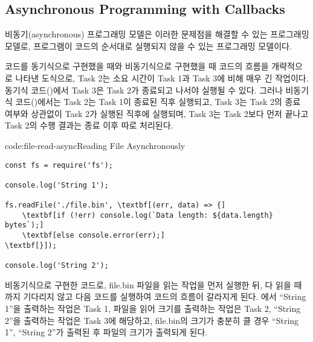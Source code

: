 \subsection*{Asynchronous Programming with Callbacks}

비동기(asynchronous) 프로그래밍 모델은 이러한 문제점을 해결할 수 있는 프로그래밍 모델로, 프로그램이 코드의 순서대로 실행되지 않을 수 있는 프로그래밍 모델이다.


\는 코드를 동기식으로 구현했을 때와 비동기식으로 구현했을 때 코드의 흐름을 개략적으로 나타낸 도식으로, Task 2는 소요 시간이 Task 1과 Task 3에 비해 매우 긴 작업이다. 동기식 코드()에서 Task 3은 Task 2가 종료되고 나서야 실행될 수 있다. 그러나 비동기식 코드()에서는 Task 2는 Task 1이 종료된 직후 실행되고, Task 3는 Task 2의 종료 여부와 상관없이 Task 2가 실행된 직후에 실행되며, Task 3는 Task 2보다 먼저 끝나고 Task 2의 수행 결과는 종료 이후 따로 처리된다.

\begin{codeenv}{code:file-read-async}{Reading File Asynchronously}
\begin{Verbatim}[commandchars=\\\[\]]
const fs = require('fs');

console.log('String 1');

fs.readFile('./file.bin', \textbf[(err, data) => {]
    \textbf[if (!err) console.log(`Data length: ${data.length} bytes`);]
    \textbf[else console.error(err);]
\textbf[}]);

console.log('String 2');
\end{Verbatim}
\end{codeenv}

\는 \를 비동기식으로 구현한 코드로, file.bin 파일을 읽는 작업을 먼저 실행한 뒤, 다 읽을 때까지 기다리지 않고 다음 코드를 실행하여 코드의 흐름이 갈라지게 된다. 에서 ``String 1''을 출력하는 작업은 Task 1, 파일을 읽어 크기를 출력하는 작업은 Task 2, ``String 2''을 출력하는 작업은 Task 3에 해당하고, file.bin의 크기가 충분히 클 경우 ``String 1'', ``String 2''가 출력된 후 파일의 크기가 출력되게 된다.

